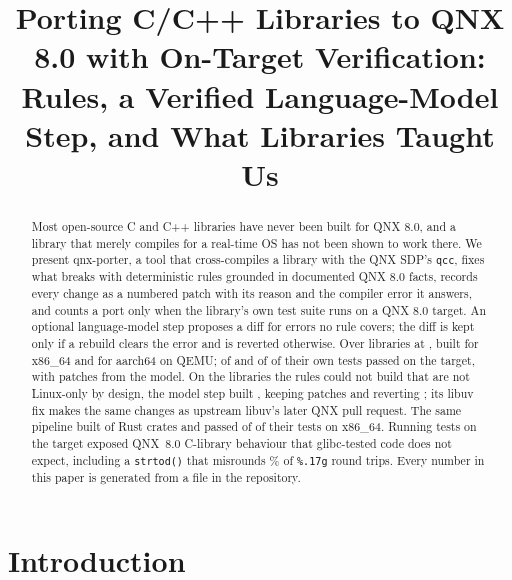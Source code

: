 \documentclass[conference]{IEEEtran}
\begin{document}
\title{Porting C/C++ Libraries to QNX 8.0 with On-Target Verification:\\
Rules, a Verified Language-Model Step, and What  Libraries Taught Us}

\author{
}

\maketitle

\begin{abstract}
Most open-source C and C++ libraries have never been built for QNX 8.0, and a library that merely compiles for
a real-time OS has not been shown to work there. We present qnx-porter, a tool that cross-compiles a library with
the QNX SDP's \texttt{qcc}, fixes what breaks with deterministic rules grounded in documented QNX 8.0 facts,
records every change as a numbered patch with its reason and the compiler error it answers, and counts a port
only when the library's own test suite runs on a QNX 8.0 target. An optional language-model step proposes a diff
for errors no rule covers; the diff is kept only if a rebuild clears the error and is reverted otherwise. Over
 libraries at ,  built for x86\_64 and  for aarch64 on QEMU;
 of  and  of  of their own tests passed
on the target, with  patches from the model. On the  libraries the rules could
not build that are not Linux-only by design, the model step built , keeping  patches and reverting
; its libuv fix makes the same changes as upstream libuv's later QNX pull request. The
same pipeline built  of  Rust crates and passed  of
 of their tests on x86\_64. Running tests on the target exposed QNX~8.0 C-library
behaviour that glibc-tested code does not expect, including a \texttt{strtod()} that misrounds
\% of \texttt{\%.17g} round trips. Every number in this paper is generated from a file in the
repository.
\end{abstract}

\section{Introduction}\label{sec:intro}
\end{document}

